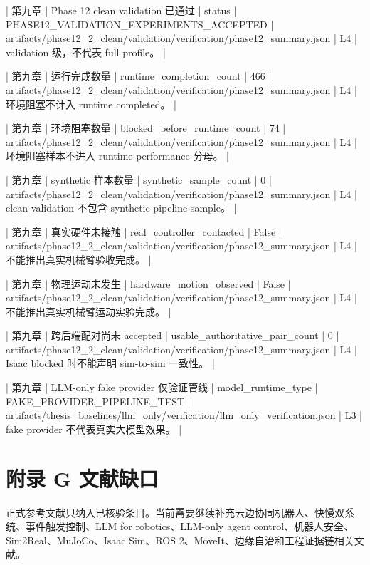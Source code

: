 | 第九章 | Phase 12 clean validation 已通过 | status | PHASE12\_VALIDATION\_EXPERIMENTS\_ACCEPTED | artifacts/phase12\_2\_clean/validation/verification/phase12\_summary.json | L4 | validation 级，不代表 full profile。 |\par
| 第九章 | 运行完成数量 | runtime\_completion\_count | 466 | artifacts/phase12\_2\_clean/validation/verification/phase12\_summary.json | L4 | 环境阻塞不计入 runtime completed。 |\par
| 第九章 | 环境阻塞数量 | blocked\_before\_runtime\_count | 74 | artifacts/phase12\_2\_clean/validation/verification/phase12\_summary.json | L4 | 环境阻塞样本不进入 runtime performance 分母。 |\par
| 第九章 | synthetic 样本数量 | synthetic\_sample\_count | 0 | artifacts/phase12\_2\_clean/validation/verification/phase12\_summary.json | L4 | clean validation 不包含 synthetic pipeline sample。 |\par
| 第九章 | 真实硬件未接触 | real\_controller\_contacted | False | artifacts/phase12\_2\_clean/validation/verification/phase12\_summary.json | L4 | 不能推出真实机械臂验收完成。 |\par
| 第九章 | 物理运动未发生 | hardware\_motion\_observed | False | artifacts/phase12\_2\_clean/validation/verification/phase12\_summary.json | L4 | 不能推出真实机械臂运动实验完成。 |\par
| 第九章 | 跨后端配对尚未 accepted | usable\_authoritative\_pair\_count | 0 | artifacts/phase12\_2\_clean/validation/verification/phase12\_summary.json | L4 | Isaac blocked 时不能声明 sim-to-sim 一致性。 |\par
| 第九章 | LLM-only fake provider 仅验证管线 | model\_runtime\_type | FAKE\_PROVIDER\_PIPELINE\_TEST | artifacts/thesis\_baselines/llm\_only/verification/llm\_only\_verification.json | L3 | fake provider 不代表真实大模型效果。 |\par

\section{附录 G 文献缺口}

正式参考文献只纳入已核验条目。当前需要继续补充云边协同机器人、快慢双系统、事件触发控制、LLM for robotics、LLM-only agent control、机器人安全、Sim2Real、MuJoCo、Isaac Sim、ROS 2、MoveIt、边缘自治和工程证据链相关文献。\par
